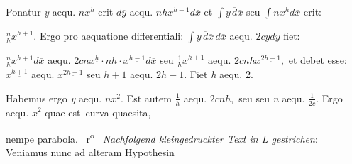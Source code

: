 %
\rule[0mm]{0pt}{5mm}%
Ponatur \textit{y} aequ. $nx^{\underline{h}}$
erit
$d\overline{y}$ aequ. $nhx^{\underline{h-1}}d\overline{x}$
et
$\displaystyle\!\!\int\!\!\overline{y\,d\overline{x}}$
seu
$\displaystyle\!\!\int\!\!\overline{nx^{\underline{h}}d\overline{x}}$
erit:
\rule[0mm]{0pt}{5mm}%
$\displaystyle\frac{n}{h}x^{\underline{h+1}}.$
Ergo pro aequatione differentiali:\protect{}
$\displaystyle\!\!\int\!\!\overline{y\,d\overline{x}}\,d\overline{x}$ aequ. $2cydy$
fiet: \rule[0mm]{0pt}{5mm}%
$\displaystyle\frac{n}{h}x^{h+1}d\overline{x}$ aequ. $2cnx^{\underline{h}}\cdot nh\cdot x^{\underline{h-1}}d\overline{x}$
seu
$\displaystyle\frac{1}{h}x^{\underline{h+1}}$ aequ. $2cnhx^{\underline{2h-1}},$
et debet esse:
$x^{\underline{h+1}}$ aequ. $x^{\underline{2h-1}}$ seu $h+1$ aequ. $2h-1.$
Fiet \textit{h} aequ. 2.
\protect\rule[-2mm]{0mm}{6mm}Habemus ergo \textit{y} aequ. $nx^2.$
Est autem
\pend
\newpage
\pstart
\noindent $\displaystyle\frac{1}{h}$ aequ. $2cnh,$
seu
%
seu \textit{n} aequ. $\displaystyle\frac{1}{2c}.$
Ergo
%
aequ. $x^2$
quae \textlangle est\textrangle\ curva quaesita,\protect{}
\rule[0mm]{0pt}{5mm}%
nempe
%
parabola.\protect{}%
%
%
%
%
~r\textsuperscript{o}\rbrack\ %
%
\pend%
\vspace{1.0em}%
%
\pstart%
\noindent%
\lbrack\textit{Nachfolgend kleingedruckter Text in L gestrichen}:\rbrack\
\pend%
\vspace{0.5em}%
%
\pstart%
\footnotesize%
Veniamus nunc ad
alteram Hypothesin\protect{}
